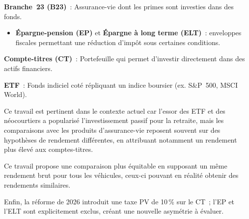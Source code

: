 \documentclass[20pt]{extarticle}
\begin{document}
\noindent
\begin{minipage}[t]{0.390\textwidth}
\vspace*{0pt}

\begin{tcolorbox}[sectionbox, title=Définitions préalables, before skip=0pt]

\textbf{Branche~23 (B23)}~: Assurance-vie dont
les primes sont investies dans des fonds.
\begin{itemize}[leftmargin=*,label=\textcolor{darkblue}{$\hookrightarrow$},itemsep=2pt,topsep=4pt]
  \item \textbf{\'Epargne-pension (EP)} et \textbf{\'Epargne \`a long terme (ELT)}~:
    enveloppes fiscales permettant une r\'eduction d'imp\^ot sous certaines conditions.
\end{itemize}

\smallskip
\textbf{Compte-titres (CT)}~: Portefeuille qui permet d'investir directement dans des actifs financiers.

\smallskip
\textbf{ETF}~: Fonds indiciel cot\'e r\'epliquant un indice boursier
(ex. S\&P~500, MSCI World).

\end{tcolorbox}

\vspace{10pt}

\begin{tcolorbox}[sectionbox, title=Contexte et objectif]
Ce travail est pertinent dans le contexte actuel car l'essor des ETF et des
n\'eocourtiers a popularis\'e l'investissement passif pour la retraite, mais
les comparaisons avec les produits d'assurance-vie reposent souvent sur des
hypoth\`eses de rendement diff\'erentes, en attribuant notamment un rendement
plus \'elev\'e aux comptes-titres.

\vspace{10pt}

Ce travail propose une comparaison plus \'equitable en supposant un m\^eme
rendement brut pour tous les v\'ehicules, ceux-ci pouvant en r\'ealit\'e
obtenir des rendements similaires.

\vspace{10pt}

Enfin, la r\'eforme de 2026 introduit une taxe PV de 10\,\% sur le CT~;
l'EP et l'ELT sont explicitement exclus, cr\'eant une nouvelle asym\'etrie
\`a \'evaluer.
\end{tcolorbox}

\end{minipage}%
\end{document}
